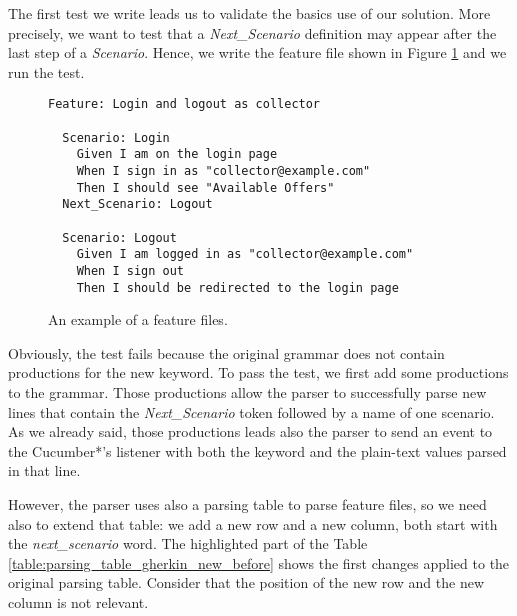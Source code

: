 The first test we write leads us to validate the basics use of our solution. More precisely, we want to test that a \textit{Next\_Scenario} definition may appear after the last step of a \textit{Scenario}. Hence, we write the feature file shown in Figure \ref{figure:scenario_example_next_scenario} and we run the test.

\begin{figure}[H]
\begin{verbatim}
Feature: Login and logout as collector

  Scenario: Login
    Given I am on the login page
    When I sign in as "collector@example.com"
    Then I should see "Available Offers"
  Next_Scenario: Logout

  Scenario: Logout
    Given I am logged in as "collector@example.com"
    When I sign out
    Then I should be redirected to the login page
\end{verbatim}
\vspace{-1em}
\caption{An example of a feature files.}
\label{figure:scenario_example_next_scenario}
\end{figure}

Obviously, the test fails because the original grammar does not contain productions for the new keyword. To pass the test, we first add some productions to the grammar. Those productions allow the parser to successfully parse new lines that contain the \textit{Next\_Scenario} token followed by a name of one scenario. As we already said, those productions leads also the parser to send an event to the Cucumber*'s listener with both the keyword and the plain-text values parsed in that line.

However, the parser uses also a parsing table to parse feature files, so we need also to extend that table: we add a new row and a new column, both start with the \textit{next\_scenario} word. The highlighted part of the Table \ref{table:parsing_table_gherkin_new_before} shows the first changes applied to the original parsing table. Consider that the position of the new row and the new column is not relevant.


